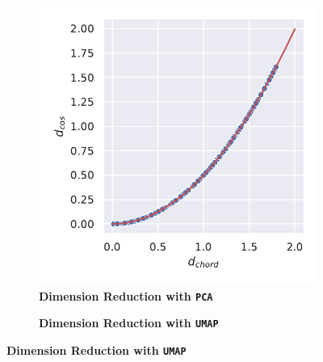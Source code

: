 \vspace{1em}

\begin{figure}[!hbt]
    \centering
    \begin{subfigure}[b]{0.475\textwidth}
        \caption[Dimension Reduction with \texttt{PCA}]{\textbf{Dimension Reduction with \texttt{PCA}}}
        \label{subfig:Normalisation_PCA}            \includegraphics[width=\textwidth]{PCA/Difference_Distance_Calculation.pdf}
    \end{subfigure}
    \hfill
    \begin{subfigure}[b]{0.475\textwidth}
        \caption[Dimension Reduction with \texttt{UMAP}]{\textbf{Dimension Reduction with \texttt{UMAP}}}

\end{subfigure}
\end{figure}
